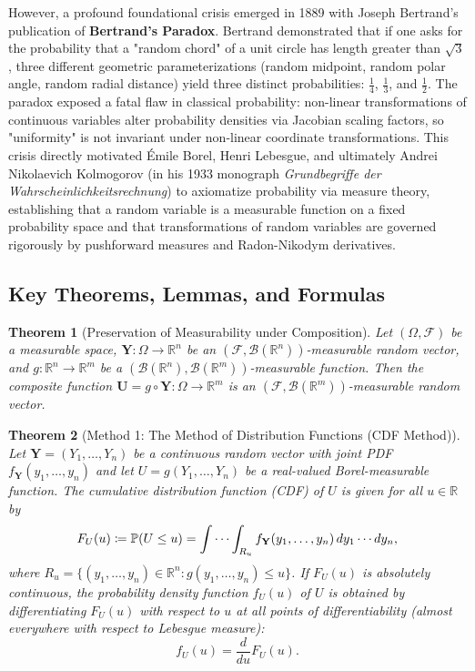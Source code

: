 \documentclass[11pt, letterpaper]{article}
\newtheorem{theorem}{Theorem}[section]
\theoremstyle{definition}
\theoremstyle{remark}
\newcommand{\R}{\mathbb{R}}
\newcommand{\Prob}{\mathbb{P}}
\newcommand{\F}{\mathcal{F}}
\begin{document}
However, a profound foundational crisis emerged in 1889 with Joseph Bertrand's publication of \textbf{Bertrand's Paradox}. Bertrand demonstrated that if one asks for the probability that a "random chord" of a unit circle has length greater than $\sqrt{3}$, three different geometric parameterizations (random midpoint, random polar angle, random radial distance) yield three distinct probabilities: $\frac{1}{4}$, $\frac{1}{3}$, and $\frac{1}{2}$. The paradox exposed a fatal flaw in classical probability: non-linear transformations of continuous variables alter probability densities via Jacobian scaling factors, so "uniformity" is not invariant under non-linear coordinate transformations. This crisis directly motivated Émile Borel, Henri Lebesgue, and ultimately Andrei Nikolaevich Kolmogorov (in his 1933 monograph \textit{Grundbegriffe der Wahrscheinlichkeitsrechnung}) to axiomatize probability via measure theory, establishing that a random variable is a measurable function on a fixed probability space and that transformations of random variables are governed rigorously by pushforward measures and Radon-Nikodym derivatives.

\subsection{Key Theorems, Lemmas, and Formulas}

\begin{theorem}[Preservation of Measurability under Composition]
\label{thm:measurability}
Let $(\Omega, \F)$ be a measurable space, $\mathbf{Y}: \Omega \to \R^n$ be an $(\F, \mathcal{B}(\R^n))$-measurable random vector, and $g: \R^n \to \R^m$ be a $(\mathcal{B}(\R^n), \mathcal{B}(\R^m))$-measurable function. Then the composite function $\mathbf{U} = g \circ \mathbf{Y}: \Omega \to \R^m$ is an $(\F, \mathcal{B}(\R^m))$-measurable random vector.
\end{theorem}

\begin{theorem}[Method 1: The Method of Distribution Functions (CDF Method)]
\label{thm:cdf_method}
Let $\mathbf{Y} = (Y_1, \dots, Y_n)$ be a continuous random vector with joint PDF $f_{\mathbf{Y}}(y_1, \dots, y_n)$ and let $U = g(Y_1, \dots, Y_n)$ be a real-valued Borel-measurable function. The cumulative distribution function (CDF) of $U$ is given for all $u \in \R$ by
\[
    F_U(u) \coloneqq \Prob(U \le u) = \idotsint_{R_u} f_{\mathbf{Y}}(y_1, \dots, y_n) \, dy_1 \cdots dy_n,
\]
where $R_u = \{(y_1, \dots, y_n) \in \R^n : g(y_1, \dots, y_n) \le u\}$. If $F_U(u)$ is absolutely continuous, the probability density function $f_U(u)$ of $U$ is obtained by differentiating $F_U(u)$ with respect to $u$ at all points of differentiability (almost everywhere with respect to Lebesgue measure):
\[
    f_U(u) = \frac{d}{du} F_U(u).
\]
\end{theorem}
\end{document}
